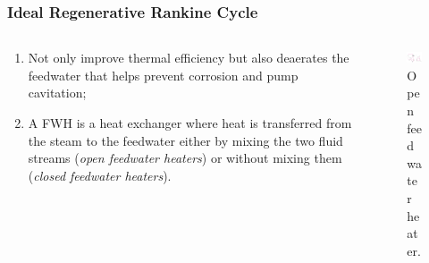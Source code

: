 \documentclass[10pt,compress]{beamer}
\begin{document}
\begin{frame}
 \frametitle{Ideal Regenerative Rankine Cycle}
  \begin{columns}
   \begin{column}[c]{0.5\linewidth}
    \begin{enumerate} %
     \item <1-> Not only improve thermal efficiency but also deaerates the feedwater that helps prevent corrosion and pump cavitation;
     \item <2-> A FWH is a heat exchanger where heat is transferred from the steam to the feedwater either by mixing the two fluid streams ({\it open feedwater heaters}) or without mixing them ({\it closed feedwater heaters}).
    \end{enumerate} 
   \end{column}

   \begin{column}[c]{0.5\linewidth} 
    \begin{figure}%
     \begin{center}
      \includegraphics[width=6.25cm,clip]{./Pics/Regenerative_Rankine_Cycle_OpenFWH}
      \caption{\scriptsize Open feedwater heater.} 
     \end{center}
    \end{figure}  
   \end{column}
  \end{columns}
 \normalsize
\end{frame}
\end{document}
